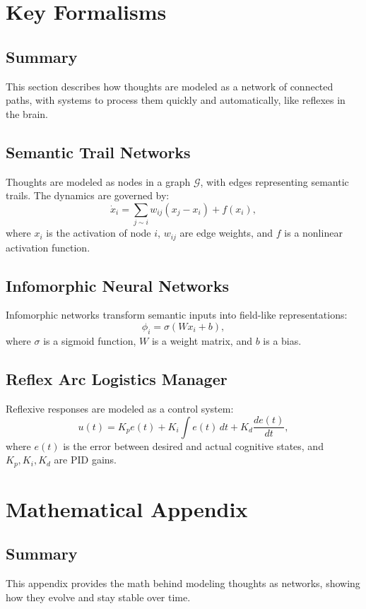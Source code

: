 \documentclass[11pt,oneside]{memoir}
\theoremstyle{plain}
\begin{document}
\section{Key Formalisms}
\subsection{Summary}
This section describes how thoughts are modeled as a network of connected paths, with systems to process them quickly and automatically, like reflexes in the brain.

\subsection{Semantic Trail Networks}
Thoughts are modeled as nodes in a graph \(\mathcal{G}\), with edges representing semantic trails. The dynamics are governed by:
\begin{equation}
    \dot{x}_i = \sum_{j \sim i} w_{ij} (x_j - x_i) + f(x_i),
\end{equation}
where \(x_i\) is the activation of node \(i\), \(w_{ij}\) are edge weights, and \(f\) is a nonlinear activation function.

\subsection{Infomorphic Neural Networks}
Infomorphic networks transform semantic inputs into field-like representations:
\begin{equation}
    \phi_i = \sigma(W x_i + b),
\end{equation}
where \(\sigma\) is a sigmoid function, \(W\) is a weight matrix, and \(b\) is a bias.

\subsection{Reflex Arc Logistics Manager}
Reflexive responses are modeled as a control system:
\begin{equation}
    u(t) = K_p e(t) + K_i \int e(t) \, dt + K_d \frac{de(t)}{dt},
\end{equation}
where \(e(t)\) is the error between desired and actual cognitive states, and \(K_p, K_i, K_d\) are PID gains.

\section{Mathematical Appendix}
\subsection{Summary}
This appendix provides the math behind modeling thoughts as networks, showing how they evolve and stay stable over time.
\end{document}

